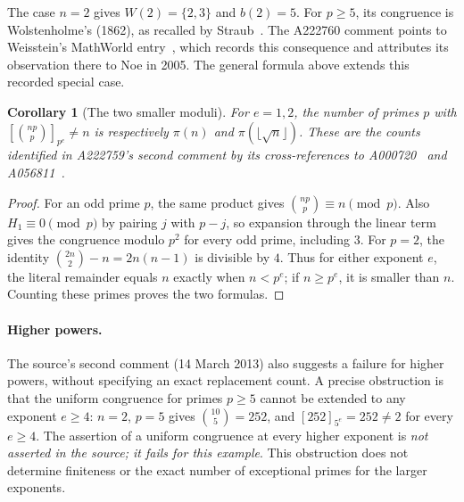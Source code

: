 \documentclass[11pt]{article}
\newtheorem{corollary}[theorem]{Corollary}
\newcommand{\binrem}[3]{\left[\binom{#1#2}{#2}\right]_{#2^{#3}}}
\begin{document}
The case $n=2$ gives $W(2)=\{2,3\}$ and $b(2)=5$.
For $p\ge5$, its congruence is Wolstenholme's (1862), as recalled by
Straub~\cite[\S2]{straub}. The A222760 comment points to Weisstein's
MathWorld entry~\cite[eq.~(6)]{mathworld}, which records this consequence
and attributes its observation there to Noe in 2005. The general formula
above extends this recorded special case.

\begin{corollary}[The two smaller moduli]\label{cor:lower}
For $e=1,2$, the number of primes $p$ with $\binrem{n}{p}{e}\ne n$ is
respectively $\pi(n)$ and $\pi(\lfloor\sqrt n\rfloor)$.
These are the counts identified in A222759's second comment by its
cross-references to A000720~\cite{pi} and A056811~\cite{square}.
\end{corollary}
\begin{proof}
For an odd prime $p$, the same product gives
$\binom{np}{p}\equiv n\pmod p$. Also $H_1\equiv0\pmod p$ by pairing $j$
with $p-j$, so expansion through the linear term gives the congruence
modulo $p^2$ for every odd prime, including $3$.
For $p=2$, the identity $\binom{2n}{2}-n=2n(n-1)$ is divisible by $4$.
Thus for either exponent $e$, the literal remainder equals $n$ exactly
when $n<p^e$; if $n\ge p^e$, it is smaller than $n$. Counting these primes
proves the two formulas.
\end{proof}

\paragraph{Higher powers.}
The source's second comment (14 March 2013) also suggests a failure for
higher powers, without specifying an exact replacement count. A precise
obstruction is that the uniform congruence for primes $p\ge5$ cannot be
extended to any exponent
$e\ge4$: $n=2$, $p=5$ gives $\binom{10}{5}=252$, and
$[252]_{5^e}=252\ne2$ for every $e\ge4$.
The assertion of a uniform congruence at every higher exponent is
\emph{not asserted in the source; it fails for this example}.
This obstruction does not determine finiteness or the exact number of
exceptional primes for the larger exponents.
\end{document}
